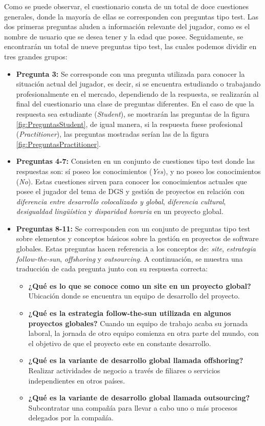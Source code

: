 Como se puede observar, el cuestionario consta de un total de doce cuestiones generales, donde la mayoría de ellas se corresponden con preguntas tipo test. Las dos primeras preguntas aluden a información relevante del jugador, como es el nombre de usuario que se desea tener y la edad que posee. Seguidamente, se encontrarán un total de nueve preguntas tipo test, las cuales podemos dividir en tres grandes grupos:

\begin{itemize}
	\item \textbf{Pregunta 3:} Se corresponde con una pregunta utilizada para conocer la situación actual del jugador, es decir, si se encuentra estudiando o trabajando profesionalmente en el mercado, dependiendo de la respuesta, se realizarán al final del cuestionario una clase de preguntas diferentes. En el caso de que la respuesta sea estudiante (\emph{Student}), se mostrarán las preguntas de la figura \ref{fig:PreguntasStudent}, de igual manera, si la respuesta fuese profesional (\emph{Practitioner}), las preguntas mostradas serían las de la figura \ref{fig:PreguntasPractitioner}.
	\item \textbf{Preguntas 4-7:} Consisten en un conjunto de cuestiones tipo test donde las respuestas son: sí poseo los conocimientos (\emph{Yes}), y no poseo los conocimientos (\emph{No}). Estas cuestiones sirven para conocer los conocimientos actuales que posee el jugador del tema de DGS y gestión de proyectos en relación con \emph{diferencia entre desarrollo colocalizado y global}, \emph{diferencia cultural}, \emph{desigualdad lingüística} y \emph{disparidad horaria} en un proyecto global.
	\item \textbf{Preguntas 8-11:} Se corresponden con un conjunto de preguntas tipo test sobre elementos y conceptos básicos sobre la gestión en proyectos de software globales. Estas preguntas hacen referencia a los conceptos de: \emph{site}, \emph{estrategia follow-the-sun}, \emph{offshoring} y \emph{outsourcing}. A continuación, se muestra una traducción de cada pregunta junto con su respuesta correcta:
	\begin{itemize}
		\item \textbf{¿Qué es lo que se conoce como un site en un proyecto global?} Ubicación donde se encuentra un equipo de desarrollo del proyecto.
		\item \textbf{¿Qué es la estrategia follow-the-sun utilizada en algunos proyectos globales?} Cuando un equipo de trabajo acaba su jornada laboral, la jornada de otro equipo comienza en otra parte del mundo, con el objetivo de que el proyecto este en constante desarrollo.
		\item \textbf{¿Qué es la variante de desarrollo global llamada offshoring?} Realizar actividades de negocio a través de filiares o servicios independientes en otros países.
		\item \textbf{¿Qué es la variante de desarrollo global llamada outsourcing?} Subcontratar una compañía para llevar a cabo uno o más procesos delegados por la compañía.
	\end{itemize}
\end{itemize}

